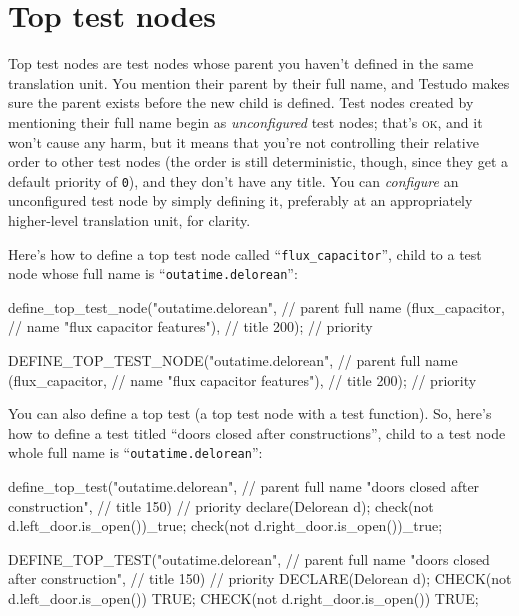 \documentclass[twoside, a4paper, article]{memoir}
\begin{document}
\section{Top test nodes}
\label{sec:top-test-nodes}

Top test nodes are test nodes whose parent you haven't defined in the same
translation unit.  You mention their parent by their full name, and Testudo
makes sure the parent exists before the new child is defined.  Test nodes
created by mentioning their full name begin as \emph{unconfigured} test nodes;
that's \textsc{ok}, and it won't cause any harm, but it means that you're not
controlling their relative order to other test nodes (the order is still
deterministic, though, since they get a default priority of \texttt{0}), and
they don't have any title.  You can \emph{configure} an unconfigured test node
by simply defining it, preferably at an appropriately higher-level translation
unit, for clarity.

Here's how to define a top test node called ``\texttt{flux\_capacitor}'', child
to a test node whose full name is ``\texttt{outatime.delorean}'':
\begin{cpplisting}
define_top_test_node("outatime.delorean", // parent full name
                     (flux_capacitor, // name
                      "flux capacitor features"), // title
                     200); // priority
\end{cpplisting}

\begin{cpplisting}
DEFINE_TOP_TEST_NODE("outatime.delorean", // parent full name
                     (flux_capacitor, // name
                      "flux capacitor features"), // title
                     200); // priority
\end{cpplisting}

You can also define a top test (a top test node with a test function).  So,
here's how to define a test titled ``doors closed after constructions'', child
to a test node whole full name is ``\texttt{outatime.delorean}'':
\begin{cpplisting}
define_top_test("outatime.delorean", // parent full name
                "doors closed after construction", // title
                150) { // priority
  declare(Delorean d);
  check(not d.left_door.is_open())_true;
  check(not d.right_door.is_open())_true;
}
\end{cpplisting}

\begin{cpplisting}
DEFINE_TOP_TEST("outatime.delorean", // parent full name
                "doors closed after construction", // title
                150) // priority
{
  DECLARE(Delorean d);
  CHECK(not d.left_door.is_open()) TRUE;
  CHECK(not d.right_door.is_open()) TRUE;
}
\end{cpplisting}
\end{document}
